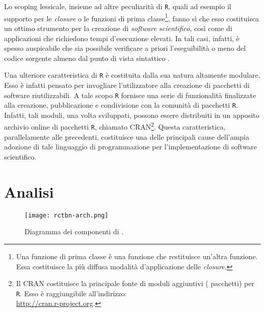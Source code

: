 Lo scoping lessicale, insieme ad altre peculiarità di \lstinline$R$, quali ad esempio il supporto per le \emph{closure} o le funzioni di prima classe\footnote{Una funzione di prima classe è una funzione che restituisce un'altra funzione. Essa costituisce la più diffusa modalità d'applicazione delle \emph{closure}.}, fanno sì che esso costituisca un ottimo strumento per la creazione di \emph{software scientifico}, così come di applicazioni che richiedono tempi d'esecuzione elevati. In tali casi, infatti, è spesso auspicabile che sia possibile verificare a priori l'eseguibilità o meno del codice sorgente almeno dal punto di vista sintattico \citep{Oliveira2006}.

Una ulteriore caratteristica di \lstinline$R$ è costituita dalla sua natura altamente modulare. Esso è infatti pensato per invogliare l'utilizzatore alla creazione di pacchetti di software riutilizzabili. A tale scopo \lstinline$R$ fornisce una serie di funzionalità finalizzate alla creazione, pubblicazione e condivisione con la comunità di pacchetti \lstinline$R$. Infatti, tali moduli, una volta sviluppati, possono essere distribuiti in un apposito archivio online di pacchetti \lstinline$R$, chiamato \acs{CRAN}\footnote{Il \acf{CRAN} costituisce la principale fonte di moduli aggiuntivi (\ie{} pacchetti) per \lstinline$R$. Esso è raggiungibile all'indirizzo: \\ \url{http://cran.r-project.org}.}. Questa caratteristica, parallelamente alle precedenti, costituisce una delle principali cause dell'ampia adozione di tale linguaggio di programmazione per l'implementazione di software scientifico.

\section{Analisi}

\begin{figure}
	\centering
	\texttt{[image: rctbn-arch.png]}
	\caption[Diagramma dei componenti di \rctbn{}]{Diagramma dei componenti di \rctbn{}.}
	\label{fig:rctbncomponents}
\end{figure}






